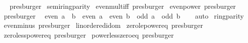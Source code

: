 \begin{isabellebody}
\isadelimproof
\ %
\endisadelimproof
%
\isatagproof
{}\isamarkupfalse%
\ presburger%
\endisatagproof
{\isafoldproof}%
%
\isadelimproof
%
\endisadelimproof
\isanewline
\isanewline
{}\isamarkupfalse%
\ semiring{\isacharunderscore}{\kern0pt}parity\isanewline
{}\isanewline
\isanewline
{}\isamarkupfalse%
\ even{\isacharunderscore}{\kern0pt}mult{\isacharunderscore}{\kern0pt}iff\ {\isacharbrackleft}{\kern0pt}presburger{\isacharbrackright}{\kern0pt}\isanewline
\isanewline
{}\isamarkupfalse%
\ even{\isacharunderscore}{\kern0pt}power\ {\isacharbrackleft}{\kern0pt}presburger{\isacharbrackright}{\kern0pt}\isanewline
\isanewline
{}\isamarkupfalse%
\ {\isacharbrackleft}{\kern0pt}presburger{\isacharbrackright}{\kern0pt}{\isacharcolon}{\kern0pt}\isanewline
\ \ {\isachardoublequoteopen}even\ {\isacharparenleft}{\kern0pt}a\ {\isacharplus}{\kern0pt}\ b{\isacharparenright}{\kern0pt}\ {\isasymlongleftrightarrow}\ even\ a\ {\isasymand}\ even\ b\ {\isasymor}\ odd\ a\ {\isasymand}\ odd\ b{\isachardoublequoteclose}\isanewline
%
\isadelimproof
\ \ %
\endisadelimproof
%
\isatagproof
{}\isamarkupfalse%
\ auto%
\endisatagproof
{\isafoldproof}%
%
\isadelimproof
\isanewline
%
\endisadelimproof
\isanewline
{}\isamarkupfalse%
\isanewline
\isanewline
{}\isamarkupfalse%
\ ring{\isacharunderscore}{\kern0pt}parity\isanewline
{}\isanewline
\isanewline
{}\isamarkupfalse%
\ even{\isacharunderscore}{\kern0pt}minus\ {\isacharbrackleft}{\kern0pt}presburger{\isacharbrackright}{\kern0pt}\isanewline
\isanewline
{}\isamarkupfalse%
\isanewline
\isanewline
{}\isamarkupfalse%
\ linordered{\isacharunderscore}{\kern0pt}idom\isanewline
{}\isanewline
\isanewline
{}\isamarkupfalse%
\ zero{\isacharunderscore}{\kern0pt}le{\isacharunderscore}{\kern0pt}power{\isacharunderscore}{\kern0pt}eq\ {\isacharbrackleft}{\kern0pt}presburger{\isacharbrackright}{\kern0pt}\isanewline
\isanewline
{}\isamarkupfalse%
\ zero{\isacharunderscore}{\kern0pt}less{\isacharunderscore}{\kern0pt}power{\isacharunderscore}{\kern0pt}eq\ {\isacharbrackleft}{\kern0pt}presburger{\isacharbrackright}{\kern0pt}\isanewline
\isanewline
{}\isamarkupfalse%
\ power{\isacharunderscore}{\kern0pt}less{\isacharunderscore}{\kern0pt}zero{\isacharunderscore}{\kern0pt}eq\ {\isacharbrackleft}{\kern0pt}presburger{\isacharbrackright}{\kern0pt}\isanewline
\ \ \isanewline
{}\isamarkupfalse%

\end{isabellebody}
